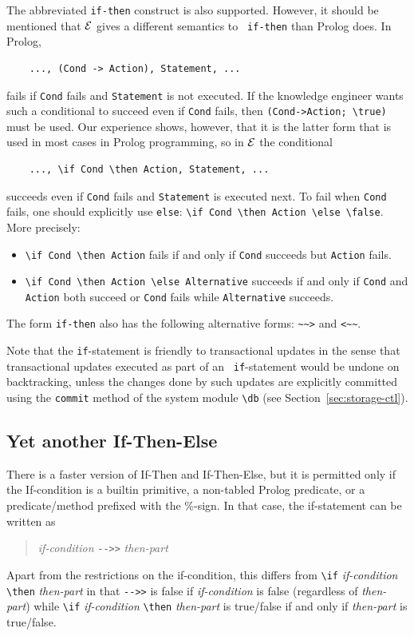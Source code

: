 \documentclass[11pt]{article}
\newcommand{\ERGO}{\mbox{\ensuremath{\cal{E}}\smaller{{\sc{RGO}}}}\xspace}
\newcommand{\FLSYSTEM}{\ERGO}
\newcommand{\rnafarr}{\texttt{\textasciitilde\textasciitilde>}}
\newcommand{\lnafarr}{\texttt{<\textasciitilde\textasciitilde}}
\newcommand{\bs}{\textbackslash}
\begin{document}
The abbreviated {\tt if-then} construct is also supported.  However, it
should be mentioned that \FLSYSTEM gives a different semantics to {\tt
  if-then} than Prolog does. In Prolog,
\begin{verbatim}
    ..., (Cond -> Action), Statement, ...  
\end{verbatim}
fails if {\tt Cond} fails and {\tt Statement} is not executed. If the
knowledge engineer
wants such a conditional to succeed even if {\tt Cond} fails, then
{\tt (Cond->Action; \bs{}true)} must be used. Our experience shows, however,
that it is the latter form that is used in most cases in Prolog
programming, so in \FLSYSTEM the conditional
\begin{verbatim}
    ..., \if Cond \then Action, Statement, ...  
\end{verbatim}
succeeds even if {\tt Cond} fails and {\tt Statement} is executed next. To
fail when {\tt Cond} fails, one should explicitly use {\tt else}:
{\tt \bs{}if Cond \bs{}then Action \bs{}else \bs{}false}. More precisely:
\begin{itemize}
  \item  {\tt \bs{}if Cond \bs{}then Action} fails if and only if {\tt Cond} succeeds
    but {\tt Action} fails.
  \item {\tt \bs{}if Cond \bs{}then Action \bs{}else Alternative} succeeds if and only if 
    {\tt Cond} and {\tt Action} both succeed or {\tt Cond} fails while
    {\tt Alternative} succeeds.
\end{itemize}
\index{\rnafarr}
\index{\lnafarr}
The form {\tt if-then} also has the following alternative forms: \rnafarr
and \lnafarr.

Note that the {\tt if}-statement is friendly to transactional updates in
the sense that transactional updates executed as part of an {\tt
  if}-statement would be undone on backtracking, unless the changes done by
such updates are explicitly committed using the {\tt commit} method of the
system module {\tt \bs{}db} (see Section~\ref{sec:storage-ctl}).

\subsection{Yet another If-Then-Else}

There is a faster version of If-Then and If-Then-Else, but it is permitted
only if the If-condition is a builtin primitive, a non-tabled Prolog predicate,
or a predicate/method prefixed with the \%-sign. In that case, the
if-statement can be written as
\begin{quote}
    \emph{if-condition} \texttt{-{}->{}>} \emph{then-part}    
\end{quote}
Apart from the restrictions on the if-condition, this differs from
\texttt{\bs{}if}  \emph{if-condition} \texttt{\bs{}then}  \emph{then-part} in that
\texttt{-{}->{}>} is false if \emph{if-condition} is false (regardless of
\emph{then-part}) while  \texttt{\bs{}if}  \emph{if-condition}
\texttt{\bs{}then} 
\emph{then-part} is true/false if and only if \emph{then-part} is true/false.
\end{document}
